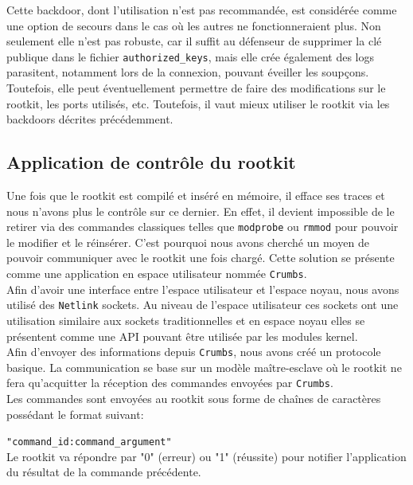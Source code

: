 \documentclass[12pt]{article}
\begin{document}
            Cette backdoor, dont l'utilisation n'est pas recommandée, est considérée comme une option de secours dans le cas où les autres ne fonctionneraient plus. Non seulement elle n'est pas robuste, car il suffit au défenseur de supprimer la clé publique dans le fichier \texttt{authorized\_keys}, mais elle crée également des logs parasitent, notamment lors de la connexion, pouvant éveiller les soupçons. Toutefois, elle peut éventuellement permettre de faire des modifications sur le rootkit, les ports utilisés, etc. Toutefois, il vaut mieux utiliser le rootkit via les backdoors décrites précédemment.
            
    \subsection{Application de contrôle du rootkit}
    \label{sec:crumb}

        Une fois que le rootkit est compilé et inséré en mémoire, il efface ses traces et nous n'avons plus le contrôle sur ce dernier. En effet, il devient impossible de le retirer via des commandes classiques telles que \texttt{modprobe} ou \texttt{rmmod} pour pouvoir le modifier et le réinsérer. C'est pourquoi nous avons cherché un moyen de pouvoir communiquer avec le rootkit une fois chargé. Cette solution se présente comme une application en espace utilisateur nommée \texttt{Crumbs}. \\

        Afin d'avoir une interface entre l'espace utilisateur et l'espace noyau, nous avons utilisé des \texttt{Netlink} sockets. Au niveau de l'espace utilisateur ces sockets ont une utilisation similaire aux sockets traditionnelles et en espace noyau elles se présentent comme une API pouvant être utilisée par les modules kernel. \\

        Afin d'envoyer des informations depuis \texttt{Crumbs}, nous avons créé un protocole basique. La communication se base sur un modèle maître-esclave où le rootkit ne fera qu'acquitter la réception des commandes envoyées par \texttt{Crumbs}. \\
        Les commandes sont envoyées au rootkit sous forme de chaînes de caractères possédant le format suivant:

        \texttt{"command\_id:command\_argument"}\\
        Le rootkit va répondre par "0" (erreur) ou "1" (réussite) pour notifier l'application du résultat de la commande précédente.
\end{document}
